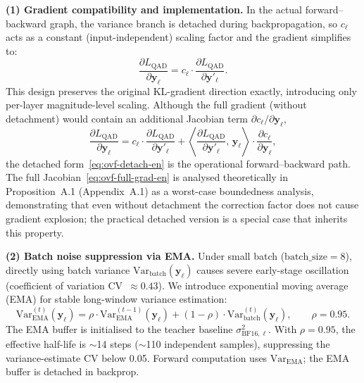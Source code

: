 \documentclass[11pt, a4paper]{article}
\begin{document}
\textbf{(1) Gradient compatibility and implementation.} In the actual forward--backward graph, the variance branch is detached during backpropagation, so $c_\ell$ acts as a constant (input-independent) scaling factor and the gradient simplifies to:
\begin{equation}
\frac{\partial L_{\mathrm{QAD}}}{\partial\bm{y}_\ell} = c_\ell\cdot\frac{\partial L_{\mathrm{QAD}}}{\partial\bm{y}'_\ell}.
\label{eq:ovf-detach-en}
\end{equation}
This design preserves the original KL-gradient direction exactly, introducing only per-layer magnitude-level scaling. Although the full gradient (without detachment) would contain an additional Jacobian term $\partial c_\ell/\partial\bm{y}_\ell$,
\begin{equation}
\frac{\partial L_{\mathrm{QAD}}}{\partial\bm{y}_\ell} = c_\ell\cdot\frac{\partial L_{\mathrm{QAD}}}{\partial\bm{y}'_\ell} + \left\langle\frac{\partial L_{\mathrm{QAD}}}{\partial\bm{y}'_\ell},\,\bm{y}_\ell\right\rangle\cdot\frac{\partial c_\ell}{\partial\bm{y}_\ell},
\label{eq:ovf-full-grad-en}
\end{equation}
the detached form~\eqref{eq:ovf-detach-en} is the operational forward--backward path. The full Jacobian~\eqref{eq:ovf-full-grad-en} is analysed theoretically in Proposition~A.1 (Appendix~A.1) as a worst-case boundedness analysis, demonstrating that even without detachment the correction factor does not cause gradient explosion; the practical detached version is a special case that inherits this property.

\textbf{(2) Batch noise suppression via EMA.} Under small batch ($\text{batch\_size}=8$), directly using batch variance $\mathrm{Var}_{\mathrm{batch}}(\bm{y}_\ell)$ causes severe early-stage oscillation (coefficient of variation CV~$\approx 0.43$). We introduce exponential moving average (EMA) for stable long-window variance estimation:
\begin{equation}
\mathrm{Var}^{(t)}_{\mathrm{EMA}}(\bm{y}_\ell) = \rho\cdot\mathrm{Var}^{(t-1)}_{\mathrm{EMA}}(\bm{y}_\ell) + (1-\rho)\cdot\mathrm{Var}^{(t)}_{\mathrm{batch}}(\bm{y}_\ell), \qquad \rho = 0.95.
\end{equation}
The EMA buffer is initialised to the teacher baseline $\sigma^2_{\mathrm{BF16},\ell}$. With $\rho = 0.95$, the effective half-life is $\sim$14 steps ($\sim$110 independent samples), suppressing the variance-estimate CV below 0.05. Forward computation uses $\mathrm{Var}_{\mathrm{EMA}}$; the EMA buffer is detached in backprop.
\end{document}
